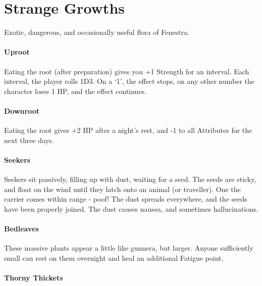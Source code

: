 \chapter{Strange Growths}

\begin{multicols}{2}

Exotic, dangerous, and occasionally useful flora of Fenestra.

\subsubsection{Uproot}
\label{uproot}

Eating the root (after preparation) gives you +1 Strength for an interval.
Each interval, the player rolls 1D3.
On a `1', the effect stops, on any other number the character loses 1 HP, and the effect continues.

\subsubsection{Downroot}
\label{downroot}

Eating the root gives +2 HP after a night's rest, and -1 to all Attributes for the next three days.

\subsubsection{Seekers}
\label{seekers}

Seekers sit passively, filling up with dust, waiting for a seed.
The seeds are sticky, and float on the wind until they latch onto an animal (or traveller).
One the carrier comes within range - poof!
The dust spreads everywhere, and the seeds have been properly joined.
The dust causes nausea, and sometimes hallucinations.

\subsubsection{Bedleaves}
\label{bedleaves}

These massive plants appear a little like gunnera, but larger.
Anyone sufficiently small can rest on them overnight and heal an additional Fatigue point.

\subsubsection{Thorny Thickets}
\label{thorny_thickets}


\end{multicols}
